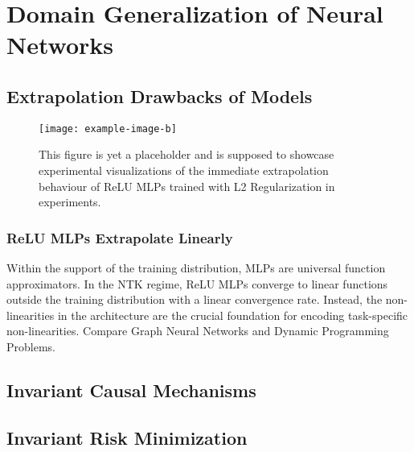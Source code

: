 

\chapter{Domain Generalization of Neural Networks}
\section{Extrapolation Drawbacks of Models}

\begin{figure}[t]
	\centering\texttt{[image: example-image-b]} 
	\caption[Empirical Extrapolation of ReLU MLP.]{This figure is yet a placeholder and is supposed to showcase experimental visualizations of the immediate extrapolation behaviour of ReLU MLPs trained with L2 Regularization in experiments.}
	\label{fig:mlp-extrapolation}
\end{figure}
\subsection{ReLU MLPs Extrapolate Linearly}
Within the support of the training distribution, MLPs are universal function approximators.
In the NTK regime, ReLU MLPs converge to linear functions outside the training distribution with a linear convergence rate.
Instead, the non-linearities in the architecture are the crucial foundation for encoding task-specific non-linearities. Compare Graph Neural Networks and Dynamic Programming Problems.

\section{Invariant Causal Mechanisms}
\section{Invariant Risk Minimization}

